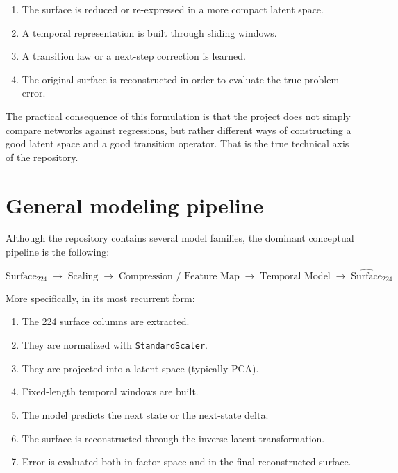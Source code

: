 \documentclass[11pt,a4paper]{article}
\newcommand{\Surface}{\ensuremath{\text{Surface}_{224}}}
\newcommand{\hSurface}{\ensuremath{\widehat{\text{Surface}}_{224}}}
\begin{document}
\begin{enumerate}[label=\arabic*.]
    \item The surface is reduced or re-expressed in a more compact latent space.
    \item A temporal representation is built through sliding windows.
    \item A transition law or a next-step correction is learned.
    \item The original surface is reconstructed in order to evaluate the true problem error.
\end{enumerate}

The practical consequence of this formulation is that the project does not simply compare networks against regressions, but rather different ways of constructing a good latent space and a good transition operator. That is the true technical axis of the repository.

\section{General modeling pipeline}

Although the repository contains several model families, the dominant conceptual pipeline is the following:

\[
\Surface \;\rightarrow\; \text{Scaling} \;\rightarrow\; \text{Compression / Feature Map} \;\rightarrow\; \text{Temporal Model} \;\rightarrow\; \hSurface
\]

More specifically, in its most recurrent form:

\begin{enumerate}[label=\arabic*.]
    \item The 224 surface columns are extracted.
    \item They are normalized with \texttt{StandardScaler}.
    \item They are projected into a latent space (typically PCA).
    \item Fixed-length temporal windows are built.
    \item The model predicts the next state or the next-state delta.
    \item The surface is reconstructed through the inverse latent transformation.
    \item Error is evaluated both in factor space and in the final reconstructed surface.
\end{enumerate}
\end{document}
